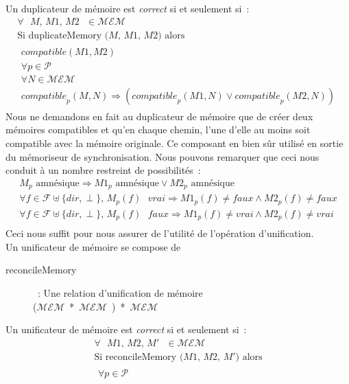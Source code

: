 \documentclass[11pt]{report}
\newcommand{\mem}{\ensuremath{\mathcal{MEM}}}
\newcommand{\path}{\ensuremath{\mathcal{P}}}
\newcommand{\comp}[3]{\ensuremath{\mathit{compatible}_{#1}(#2, #3)}}
\newcommand{\compa}[2]{\ensuremath{\mathit{compatible}(#1, #2)}}
\begin{document}
{Un duplicateur de m\'emoire est \emph{correct} si et seulement si~:
\[
\begin{array}{ll}
\forall \mbox{\ $M$, $M1$, $M2$ \ } \in \mem\ \\
\mbox{Si duplicateMemory ($M$, $M1$, $M2$) alors} \\
\begin{array}{l}
\compa{M1}{M2} \\
\forall p \in \path\ \\
\forall N \in \mem\ \\
\comp{p}{M}{N} \Rightarrow (\comp{p}{M1}{N} \vee \comp{p}{M2}{N})
\end{array} 
\end{array}
\]
Nous ne demandons en fait au duplicateur de m\'emoire que de cr\'eer deux 
m\'emoires compatibles et qu'en chaque chemin, l'une d'elle au moins soit 
compatible avec la m\'emoire originale. Ce composant en bien s\^ur 
utilis\'e en sortie du m\'emoriseur de synchronisation. Nous pouvons 
remarquer que ceci nous conduit \`a un nombre restreint de possibilit\'es~:\\
\[
\begin{array}{ll}
M_{p} \mbox{\ amn\'esique} \Rightarrow M1_{p} \mbox{\ amn\'esique} \vee
M2_{p} \mbox{\ amn\'esique}\\
\forall f \in  \mathcal{F} \uplus \{dir, \perp \} \mbox{,\ } M_{p}(f)
\mbox{\ } vrai \Rightarrow M1_{p}(f) \neq faux \wedge M2_{p}(f) \neq faux\\
\forall f \in  \mathcal{F} \uplus \{dir, \perp \} \mbox{,\ } M_{p}(f)
\mbox{\ } faux \Rightarrow M1_{p}(f) \neq vrai \wedge M2_{p}(f) \neq vrai\\
\end{array}
\]
Ceci nous suffit pour nous assurer de l'utilit\'e de l'op\'eration 
d'unification.\\
Un unificateur de m\'emoire se compose de
\begin{description}
\item [reconcileMemory]~: Une relation d'unification de m\'emoire\\
 \mbox{(\mem\ * \mem\ ) * \mem\ }
\end{description}
Un unificateur de m\'emoire est \emph{correct} si et seulement si~:
\[
\begin{array}{ll}
\forall \mbox{\ $M1$, $M2$, $M'$ \ } \in \mem\ \\
\mbox{Si reconcileMemory ($M1$, $M2$, $M'$) alors}\\
\begin{array}{l}
\forall p \in \path\ \\

\end{array}
\end{array}\]}
\end{document}
